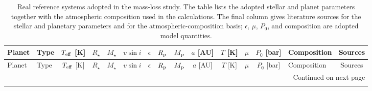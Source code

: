 \begin{landscape}
\scriptsize
\setlength{\tabcolsep}{4pt}
\renewcommand{\arraystretch}{1.0}
\begin{longtable}{llcccccccccccp{4.2cm}c}
\caption{Real reference systems adopted in the mass-loss study. The table lists the adopted stellar and planet parameters together with the atmospheric composition used in the calculations. The final column gives literature sources for the stellar and planetary parameters and for the atmospheric-composition basis; $\epsilon$, $\mu$, $P_0$, and composition are adopted model quantities.}\label{tab:real_mass_loss_reference_systems} \\
\toprule
Planet & Type & $T_{\rm eff}$ [K] & $R_\star$ & $M_\star$ & $v\sin i$ & $\epsilon$ & $R_{\rm p}$ & $M_{\rm p}$ & $a$ [AU] & $T$ [K] & $\mu$ & $P_0$ [bar] & Composition & Sources \\
\midrule
\endfirsthead

\toprule
Planet & Type & $T_{\rm eff}$ [K] & $R_\star$ & $M_\star$ & $v\sin i$ & $\epsilon$ & $R_{\rm p}$ & $M_{\rm p}$ & $a$ [AU] & $T$ [K] & $\mu$ & $P_0$ [bar] & Composition & Sources \\
\midrule
\endhead

\midrule
\multicolumn{15}{r}{Continued on next page} \\
\midrule
\endfoot


\end{longtable}
\end{landscape}
